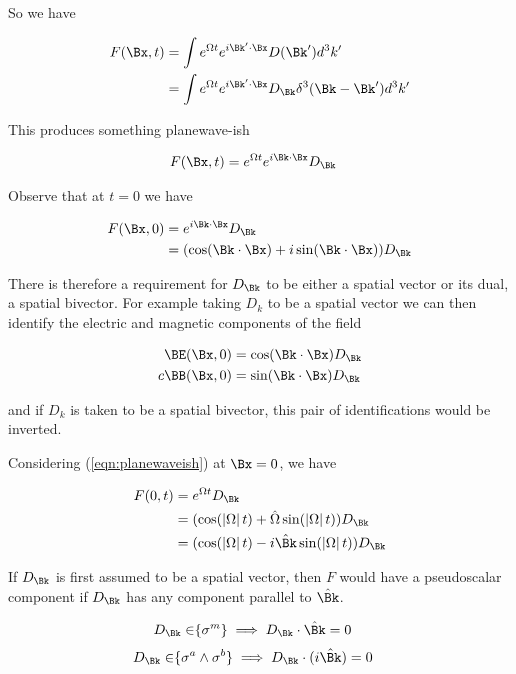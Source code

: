 \documentclass[]{eliblog}
\begin{document}
So we have

\begin{align*}
F(\Bx,t) 
&= \int e^{\Omega t} e^{i \Bk' \cdot \Bx} D(\Bk') d^3 k' \\
&= \int e^{\Omega t} e^{i \Bk' \cdot \Bx} D_\Bk \delta^3(\Bk - \Bk') d^3 k' \\
\end{align*}

This produces something planewave-ish

\begin{align}\label{eqn:planewaveish}
F(\Bx,t) &= e^{\Omega t} e^{i \Bk \cdot \Bx} D_\Bk 
\end{align}

Observe that at $t=0$ we have

\begin{align*}
F(\Bx,0) 
&= e^{i \Bk \cdot \Bx} D_\Bk  \\
&= (\cos (\Bk \cdot \Bx) + i \sin(\Bk \cdot \Bx)) D_\Bk  \\
\end{align*}

There is therefore a requirement for $D_\Bk$ to be either a spatial vector or its dual, a spatial bivector.  For example taking $D_k$ to be a spatial vector we can then identify the electric and magnetic components of the field

\begin{align*}
\BE(\Bx,0) &= \cos (\Bk \cdot \Bx) D_\Bk \\
c \BB(\Bx,0) &= \sin (\Bk \cdot \Bx) D_\Bk
\end{align*}

and if $D_k$ is taken to be a spatial bivector, this pair of identifications would be inverted.

Considering (\ref{eqn:planewaveish}) at $\Bx=0$, we have

\begin{align*}
F(0, t) 
&= e^{\Omega t} D_\Bk \\
&= (\cos(\Abs{\Omega} t) + \hat{\Omega} \sin(\Abs{\Omega} t)) D_\Bk \\
&= (\cos(\Abs{\Omega} t) - i \hat{\Bk} \sin(\Abs{\Omega} t)) D_\Bk \\
\end{align*}

If $D_\Bk$ is first assumed to be a spatial vector, then $F$ would have a pseudoscalar component if $D_\Bk$ has any
component parallel to $\hat{\Bk}$.

\begin{align}\label{eqn:commutationRequirementVector}
D_\Bk \in \span\{\sigma^m\} \implies D_\Bk \cdot \hat{\Bk} = 0 
\end{align}
\begin{align}\label{eqn:commutationRequirementBiVector}
D_\Bk \in \span\{\sigma^a \wedge \sigma^b\} \implies D_\Bk \cdot (i\hat{\Bk}) = 0
\end{align}
\end{document}
